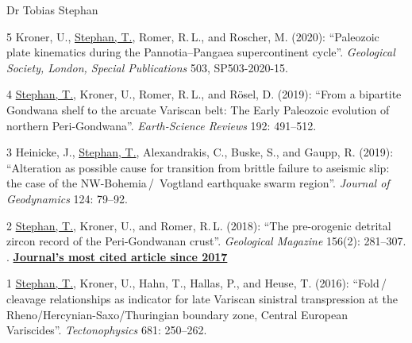 \documentclass[10pt, paper=letter]{scrartcl} %
\begin{document}
\begin{cv}{\textsf{Dr Tobias Stephan}}
\begin{cvlist}{}
        \item[] 
        \item[5] Kroner, U., \ul{Stephan, T.}, Romer, R.\,L., and Roscher, M. (2020): \enquote{Paleozoic plate kinematics during the Pannotia--Pangaea supercontinent cycle}. \textit{Geological Society, London, Special Publications} 503, SP503-2020-15. 
        \item[4] \ul{Stephan, T.}, Kroner, U., Romer, R.\,L., and R\"osel, D. (2019): \enquote{From a bipartite Gondwana shelf to the arcuate Variscan belt: The Early Paleozoic evolution of northern Peri-Gondwana}. \textit{Earth-Science Reviews} 192: 491--512. 
        \item[3] Heinicke, J., \ul{Stephan, T.}, Alexandrakis, C., Buske, S., and Gaupp, R. (2019): \enquote{Alteration as possible cause for transition from brittle failure to aseismic slip: the case of the NW-Bohemia\,/\, Vogtland earthquake swarm region}. \textit{Journal of Geodynamics} 124: 79--92. 
        \item[2] \ul{Stephan, T.}, Kroner, U., and Romer, R.\,L. (2018): \enquote{The pre-orogenic detrital zircon record of the Peri-Gondwanan crust}. \textit{Geological Magazine} 156(2): 281--307.\newline
        .
        \href{https://www.cambridge.org/core/journals/geological-magazine/most-cited?searchWithinIds=277295E1DFDC1E4700796E746AE514CC&productType=JOURNAL_ARTICLE&pageSize=20&filters\%5BisCitedByMin\%5D=0&template=cambridge-core\%2Fjournal\%2Farticle-listings\%2Flistings-wrapper&displayNasaAds=false&showCitationNumbers=true&suppressArticleTypeGrouping=true&sort=platformMetadata.citationCount.crossRef\%3Adesc&filters\%5BdateYearRange\%5D\%5Bfrom\%5D=2017}{\textbf{Journal's most cited article since 2017}}
        \item[1] \ul{Stephan, T.}, Kroner, U., Hahn, T., Hallas, P., and Heuse, T. (2016): \enquote{Fold\,/\,cleavage relationships as indicator for late Variscan sinistral transpression at the Rheno\-/Hercynian\--Saxo\-/Thuringian boundary zone, Central European Variscides}. \textit{Tectonophysics} 681: 250--262. 

    \end{cvlist}


\end{cv}
\end{document}
